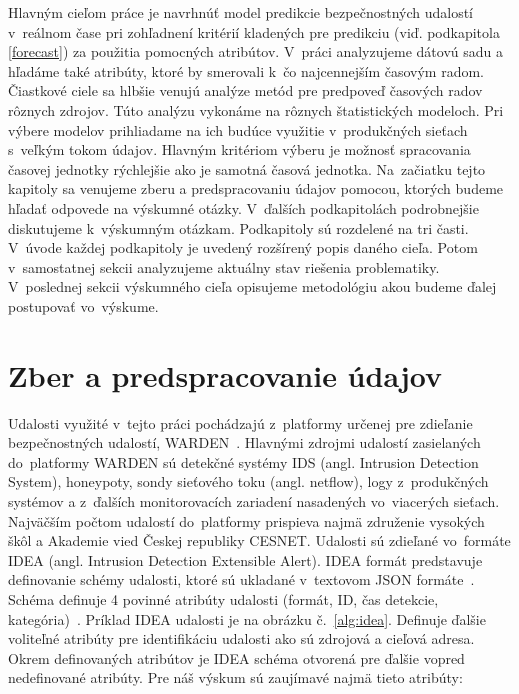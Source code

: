 \documentclass[thesismargins, thesislinespacing, openright, upjsfrontpage]{rnthesis}
\begin{document}
Hlavným cieľom práce je navrhnúť model predikcie bezpečnostných udalostí v~reálnom čase pri zohľadnení kritérií kladených pre predikciu (viď. podkapitola \ref{forecast}) za použitia pomocných atribútov. V~práci analyzujeme dátovú sadu a hľadáme také atribúty, ktoré by smerovali k~čo najcennejším časovým radom. Čiastkové ciele sa hlbšie venujú analýze metód pre predpoveď časových radov rôznych zdrojov. Túto analýzu vykonáme na rôznych štatistických modeloch. Pri výbere modelov prihliadame na ich budúce využitie v~produkčných sieťach s~veľkým tokom údajov. Hlavným kritériom výberu je možnosť spracovania časovej jednotky rýchlejšie ako je samotná časová jednotka. Na~začiatku tejto kapitoly sa venujeme zberu a predspracovaniu údajov pomocou, ktorých budeme hľadať odpovede na výskumné otázky. V~ďalších podkapitolách podrobnejšie diskutujeme k~výskumným otázkam. Podkapitoly sú rozdelené na tri časti. V~úvode každej podkapitoly je uvedený rozšírený popis daného cieľa. Potom v~samostatnej sekcii analyzujeme aktuálny stav riešenia problematiky. V~poslednej sekcii výskumného cieľa opisujeme metodológiu akou budeme ďalej postupovať vo~výskume. 

\section{Zber a predspracovanie údajov}

Udalosti využité v~tejto práci pochádzajú z~platformy určenej pre zdieľanie bezpečnostných udalostí, WARDEN~\cite{kacha2015warden}. Hlavnými zdrojmi udalostí zasielaných do~platformy WARDEN sú detekčné systémy IDS (angl. Intrusion Detection System), honeypoty, sondy sieťového toku (angl. netflow), logy z~produkčných systémov a z~ďalších monitorovacích zariadení nasadených vo~viacerých sieťach. Najväčším počtom udalostí do~platformy prispieva najmä združenie vysokých škôl a Akademie vied Českej republiky CESNET. Udalosti sú zdieľané vo~formáte IDEA (angl. Intrusion Detection Extensible Alert). IDEA formát predstavuje definovanie schémy udalosti, ktoré sú ukladané v~textovom JSON formáte~\cite{pezoa2016foundations}. Schéma definuje 4 povinné atribúty udalosti (formát, ID, čas detekcie, kategória)~\cite{kacha2014idea}. Príklad IDEA udalosti je na obrázku č.~\ref{alg:idea}. Definuje ďalšie voliteľné atribúty pre identifikáciu udalosti ako sú zdrojová a cieľová adresa. Okrem definovaných atribútov je IDEA schéma otvorená pre ďalšie vopred nedefinované atribúty. Pre náš výskum sú zaujímavé najmä tieto atribúty:
\end{document}
